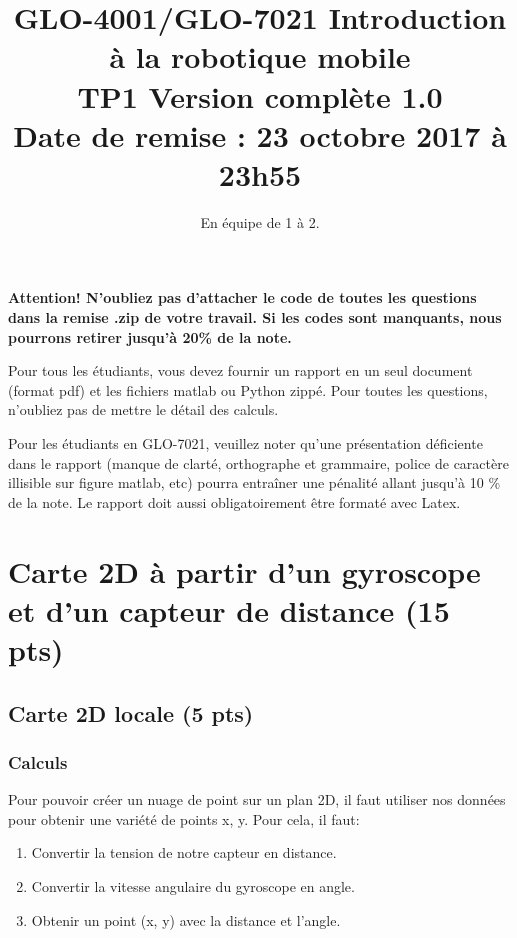 \documentclass[12pt]{article}
\begin{document}
\title{GLO-4001/GLO-7021 Introduction à la robotique mobile \\  TP1 Version complète 1.0 \\ Date de remise : 23 octobre 2017 à 23h55}
\author{En équipe de 1 à 2.}
\maketitle


{\bf Attention! N'oubliez pas d'attacher le code de toutes les questions dans la remise .zip de votre travail. Si les codes sont manquants, nous pourrons retirer jusqu'à 20\% de la note. }

Pour tous les étudiants, vous devez fournir un rapport en un seul document (format pdf) et les fichiers matlab ou Python zippé. Pour toutes les questions, n'oubliez pas de mettre le détail des calculs.

Pour les étudiants en GLO-7021, veuillez noter qu'une présentation déficiente dans le rapport (manque de clarté, orthographe et grammaire, police de caractère illisible sur figure matlab, etc) pourra entraîner une pénalité allant jusqu'à 10 \% de la note. Le rapport doit aussi obligatoirement être formaté avec Latex.


\section{Carte 2D à partir d'un gyroscope et d'un capteur de distance (15 pts)}

\subsection{Carte 2D locale (5 pts)}
\label{CarteLocale}

\subsubsection{Calculs}
Pour pouvoir créer un nuage de point sur un plan 2D, il faut utiliser nos données pour obtenir une variété de points x, y.
Pour cela, il faut:
\begin{enumerate}
        \item Convertir la tension de notre capteur en distance.
        \item Convertir la vitesse angulaire du gyroscope en angle.
        \item Obtenir un point (x, y) avec la distance et l'angle.
\end{enumerate}
\end{document}
